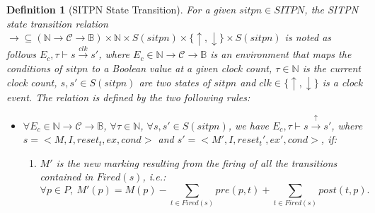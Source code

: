 \documentclass[pdflatex,sn-mathphys]{sn-jnl}%
\theoremstyle{thmstyleone}%
\theoremstyle{thmstyletwo}%
\theoremstyle{thmstylethree}%
\newtheorem{definition}{Definition}%
\begin{document}
\begin{definition}[SITPN State Transition]
  \label{def:semantics}
  For a given $sitpn\in{}SITPN$, the SITPN state transition relation
  $\rightarrow\subseteq{}(\mathbb{N}\rightarrow\mathcal{C}\rightarrow\mathbb{B})\times{}\mathbb{N}\times{}S(sitpn)\times{}\{\uparrow,\downarrow\}\times{}S(sitpn)$
  is noted as follows $E_c,\tau\vdash{}s\xrightarrow{clk}s'$, where
  $E_c\in\mathbb{N}\rightarrow\mathcal{C}\rightarrow\mathbb{B}$ is an
  environment that maps the conditions of $sitpn$ to a Boolean value
  at a given clock count, $\tau\in\mathbb{N}$ is the current clock
  count, $s,s'\in{}S(sitpn)$ are two states of $sitpn$ and
  $clk\in\{\uparrow,\downarrow\}$ is a clock event. The relation is
  defined by the two following rules:
  
  \begin{itemize}
  \item
    $\forall{}E_c\in\mathbb{N}\rightarrow\mathcal{C}\rightarrow\mathbb{B}$,
    $\forall\tau\in\mathbb{N}$, $\forall{}s,s'\in{}S(sitpn)$, we have
    $E_c,\tau\vdash{}s\xrightarrow{\uparrow}s'$, where
    $s=<M,I,reset_t,ex,cond>$ and $s'=<M',I,reset_t',ex',cond>$, if:
    \begin{enumerate}
    \item\label{it:new-marking} $M'$ is the new marking resulting
      from
      the firing of all the transitions contained in $Fired(s)$, i.e.:
      \begin{equation*}
        \forall{}p\in{}P,~M'(p)=M(p)-\sum\limits_{t\in{}Fired(s)}pre(p,t)+\sum\limits_{t\in{}Fired(s)}post(t,p).
      \end{equation*}
      

\end{enumerate}
\end{itemize}
\end{definition}
\end{document}
